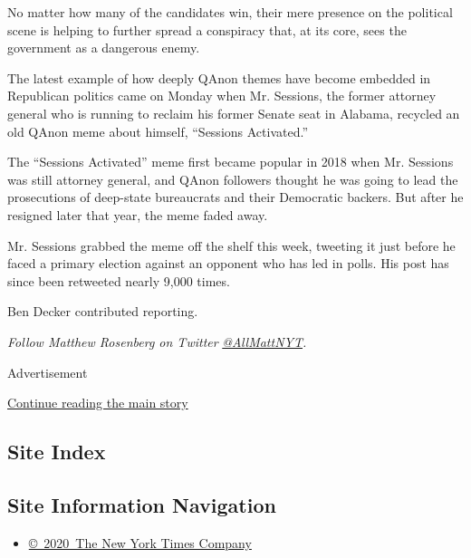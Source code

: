 No matter how many of the candidates win, their mere presence on the
political scene is helping to further spread a conspiracy that, at its
core, sees the government as a dangerous enemy.

The latest example of how deeply QAnon themes have become embedded in
Republican politics came on Monday when Mr. Sessions, the former
attorney general who is running to reclaim his former Senate seat in
Alabama, recycled an old QAnon meme about himself, ``Sessions
Activated.''

The ``Sessions Activated'' meme first became popular in 2018 when Mr.
Sessions was still attorney general, and QAnon followers thought he was
going to lead the prosecutions of deep-state bureaucrats and their
Democratic backers. But after he resigned later that year, the meme
faded away.

Mr. Sessions grabbed the meme off the shelf this week, tweeting it just
before he faced a primary election against an opponent who has led in
polls. His post has since been retweeted nearly 9,000 times.

Ben Decker contributed reporting.

\emph{Follow Matthew Rosenberg on Twitter}
\href{https://twitter.com/allmattnyt}{\emph{@AllMattNYT}}\emph{.}

Advertisement

\protect\hyperlink{after-bottom}{Continue reading the main story}

\hypertarget{site-index}{%
\subsection{Site Index}\label{site-index}}

\hypertarget{site-information-navigation}{%
\subsection{Site Information
Navigation}\label{site-information-navigation}}

\begin{itemize}
\tightlist
\item
  \href{https://help.nytimes.com/hc/en-us/articles/115014792127-Copyright-notice}{©~2020~The
  New York Times Company}
\end{itemize}


